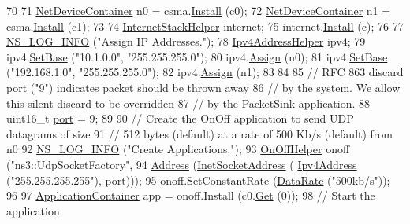 \begin{DoxyCode}
70 
71   \hyperlink{classns3_1_1NetDeviceContainer}{NetDeviceContainer} n0 = csma.\hyperlink{classns3_1_1CsmaHelper_af79a91372595230b0817200270ab84e7}{Install} (c0);
72   \hyperlink{classns3_1_1NetDeviceContainer}{NetDeviceContainer} n1 = csma.\hyperlink{classns3_1_1CsmaHelper_af79a91372595230b0817200270ab84e7}{Install} (c1);
73 
74   \hyperlink{classns3_1_1InternetStackHelper}{InternetStackHelper} internet;
75   internet.\hyperlink{classns3_1_1InternetStackHelper_a6645b412f31283d2d9bc3d8a95cebbc0}{Install} (c);
76 
77   \hyperlink{group__logging_gafbd73ee2cf9f26b319f49086d8e860fb}{NS\_LOG\_INFO} (\textcolor{stringliteral}{"Assign IP Addresses."});
78   \hyperlink{classns3_1_1Ipv4AddressHelper}{Ipv4AddressHelper} ipv4;
79   ipv4.\hyperlink{classns3_1_1Ipv4AddressHelper_acf7b16dd25bac67e00f5e25f90a9a035}{SetBase} (\textcolor{stringliteral}{"10.1.0.0"}, \textcolor{stringliteral}{"255.255.255.0"});
80   ipv4.\hyperlink{classns3_1_1Ipv4AddressHelper_af8e7f4a1a7e74c00014a1eac445a27af}{Assign} (n0);
81   ipv4.\hyperlink{classns3_1_1Ipv4AddressHelper_acf7b16dd25bac67e00f5e25f90a9a035}{SetBase} (\textcolor{stringliteral}{"192.168.1.0"}, \textcolor{stringliteral}{"255.255.255.0"});
82   ipv4.\hyperlink{classns3_1_1Ipv4AddressHelper_af8e7f4a1a7e74c00014a1eac445a27af}{Assign} (n1);
83 
84 
85   \textcolor{comment}{// RFC 863 discard port ("9") indicates packet should be thrown away}
86   \textcolor{comment}{// by the system.  We allow this silent discard to be overridden}
87   \textcolor{comment}{// by the PacketSink application.}
88   uint16\_t \hyperlink{dsdv-manet_8cc_a8e0798404bf2cf5dabb84c5ba9a4f236}{port} = 9;
89 
90   \textcolor{comment}{// Create the OnOff application to send UDP datagrams of size}
91   \textcolor{comment}{// 512 bytes (default) at a rate of 500 Kb/s (default) from n0}
92   \hyperlink{group__logging_gafbd73ee2cf9f26b319f49086d8e860fb}{NS\_LOG\_INFO} (\textcolor{stringliteral}{"Create Applications."});
93   \hyperlink{classns3_1_1OnOffHelper}{OnOffHelper} onoff (\textcolor{stringliteral}{"ns3::UdpSocketFactory"}, 
94                      \hyperlink{classns3_1_1Address}{Address} (\hyperlink{classns3_1_1InetSocketAddress}{InetSocketAddress} (
      \hyperlink{classns3_1_1Ipv4Address}{Ipv4Address} (\textcolor{stringliteral}{"255.255.255.255"}), port)));
95   onoff.SetConstantRate (\hyperlink{classns3_1_1DataRate}{DataRate} (\textcolor{stringliteral}{"500kb/s"}));
96 
97   \hyperlink{classns3_1_1ApplicationContainer}{ApplicationContainer} app = onoff.Install (c0.\hyperlink{classns3_1_1NodeContainer_a9ed96e2ecc22e0f5a3d4842eb9bf90bf}{Get} (0));
98   \textcolor{comment}{// Start the application}

\end{DoxyCode}
